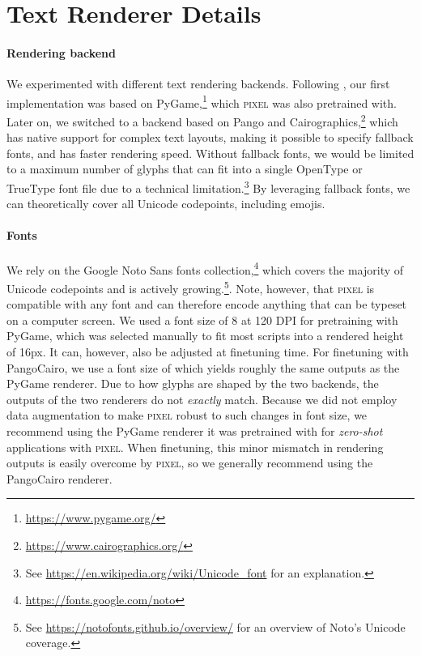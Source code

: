 \documentclass{article}
\newcommand{\model}{\textsc{pixel}\xspace}
\begin{document}
\section{Text Renderer Details}
\label{app:text_renderer}

\paragraph{Rendering backend} We experimented with different text rendering backends. Following \citet{salesky-etal-2021-robust}, our first implementation was based on PyGame,\footnote{\url{https://www.pygame.org/}} which \model was also pretrained with. Later on, we switched to a backend based on Pango \citep{taylor-2004-pango} and Cairographics,\footnote{\url{https://www.cairographics.org/}} which has native support for complex text layouts, making it possible to specify fallback fonts, and has faster rendering speed. Without fallback fonts, we would be limited to a maximum number of  glyphs that can fit into a single OpenType or TrueType font file due to a technical limitation.\footnote{See \url{https://en.wikipedia.org/wiki/Unicode_font} for an explanation.} By leveraging fallback fonts, we can theoretically cover all Unicode codepoints, including emojis. 

\paragraph{Fonts} We rely on the Google Noto Sans fonts collection,\footnote{\url{https://fonts.google.com/noto}} which covers the majority of Unicode codepoints and is actively growing.\footnote{See \url{https://notofonts.github.io/overview/} for an overview of Noto's Unicode coverage.}. Note, however, that \model is compatible with any font and can therefore encode anything that can be typeset on a computer screen. We used a font size of 8 at 120 DPI for pretraining with PyGame, which was selected manually to fit most scripts into a rendered height of 16px. It can, however, also be adjusted at finetuning time. For finetuning with PangoCairo, we use a font size of  which yields roughly the same outputs as the PyGame renderer. Due to how glyphs are shaped by the two backends, the outputs of the two renderers do not \emph{exactly} match. Because we did not employ data augmentation to make \model robust to such changes in font size,  we recommend using the PyGame renderer it was pretrained with for \emph{zero-shot} applications with \model. When finetuning, this minor mismatch in rendering outputs is easily overcome by \model, so we generally recommend using the PangoCairo renderer.
\end{document}
